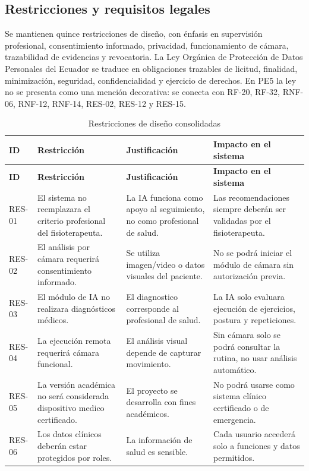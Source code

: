 \documentclass[12pt,a4paper]{article}
\begin{document}
\subsection{Restricciones y requisitos legales}
Se mantienen quince restricciones de diseño, con énfasis en supervisión profesional, consentimiento informado, privacidad, funcionamiento de cámara, trazabilidad de evidencias y revocatoria. La Ley Orgánica de Protección de Datos Personales del Ecuador se traduce en obligaciones trazables de licitud, finalidad, minimización, seguridad, confidencialidad y ejercicio de derechos. En PE5 la ley no se presenta como una mención decorativa: se conecta con RF-20, RF-32, RNF-06, RNF-12, RNF-14, RES-02, RES-12 y RES-15.

\small
\begin{longtable}{p{}p{}p{}p{}}
\caption{Restricciones de diseño consolidadas}\\
\toprule
\textbf{ID}&\textbf{Restricción}&\textbf{Justificación}&\textbf{Impacto en el sistema}\\
\midrule\endfirsthead
\toprule
\textbf{ID}&\textbf{Restricción}&\textbf{Justificación}&\textbf{Impacto en el sistema}\\
\midrule\endhead
RES-01 & El sistema no reemplazara el criterio profesional del fisioterapeuta. & La IA funciona como apoyo al seguimiento, no como profesional de salud. & Las recomendaciones siempre deberán ser validadas por el fisioterapeuta. \\
RES-02 & El análisis por cámara requerirá consentimiento informado. & Se utiliza imagen/video o datos visuales del paciente. & No se podrá iniciar el módulo de cámara sin autorización previa. \\
RES-03 & El módulo de IA no realizara diagnósticos médicos. & El diagnostico corresponde al profesional de salud. & La IA solo evaluara ejecución de ejercicios, postura y repeticiones. \\
RES-04 & La ejecución remota requerirá cámara funcional. & El análisis visual depende de capturar movimiento. & Sin cámara solo se podrá consultar la rutina, no usar análisis automático. \\
RES-05 & La versión académica no será considerada dispositivo medico certificado. & El proyecto se desarrolla con fines académicos. & No podrá usarse como sistema clínico certificado o de emergencia. \\
RES-06 & Los datos clínicos deberán estar protegidos por roles. & La información de salud es sensible. & Cada usuario accederá solo a funciones y datos permitidos. \\

\end{longtable}
\end{document}
